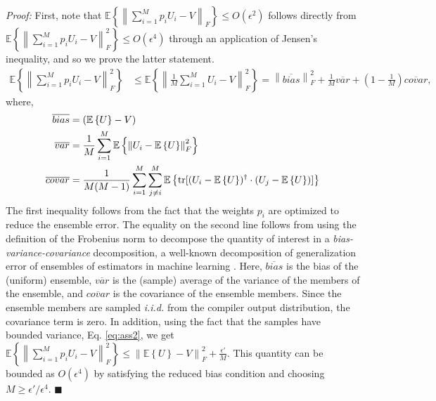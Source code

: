 \documentclass[fleqn,10pt]{wlscirep}
\newcommand{\dg}{^\dagger}
\newcommand{\normf}[1]{\left\lVert #1 \right\rVert_F}
\newcommand{\E}[1]{\mathbb{E}\left\{ #1 \right\}}
\newcommand{\tr}{{\rm tr}}
\newcommand*{\QED}{\null\nobreak\hfill\ensuremath{\blacksquare}}%
\begin{document}
\noindent \textit{Proof:} First, note that $\E{\normf{\sum_{i=1}^M p_i U_i - V}} \leq O(\epsilon^2)$ follows directly from $\E{\normf{\sum_{i=1}^M p_i U_i - V}^2} \leq O(\epsilon^4)$ through an application of Jensen's inequality, and so we prove the latter statement.
\begin{align}
    \E{\normf{\sum_{i=1}^M p_i U_i - V}^2} & \leq \E{\normf{\frac{1}{M}\sum_{i=1}^M U_i - V}^2} 
	   = \normf{\overline{bias}}^2 + \frac{1}{M}\overline{var} + \left(1-\frac{1}{M}\right)\overline{covar}, 
       \label{eq:b-v-c} 
\end{align}
where,
\begin{align}
	\overline{bias} &= (\E{U} - V) \label{eq:bias} \\
	\overline{var} &= \frac{1}{M}\sum_{i=1}^{M} \E{\normf{U_i - \E{U}}^2} \label{eq:var} \\
	\overline{covar} &= \frac{1}{M(M-1)}\sum_{i=1}^M \sum_{j \neq i}^M \mathbb{E} \left\{ \tr[(U_i-\E{U})\dg \cdot (U_j - \E{U})] \right\} 
    \label{eq:covar}
\end{align}
The first inequality follows from the fact that the weights $p_i$ are optimized to reduce the ensemble error. The equality on the second line follows from using the definition of the Frobenius norm to decompose the quantity of interest in a \emph{bias-variance-covariance} decomposition, a well-known decomposition of generalization error of ensembles of estimators in machine learning \cite{Ueda_1996, Brown_20005}. Here, $\overline{bias}$ is the bias of the (uniform) ensemble, $\overline{var}$ is the (sample) average of the variance of the members of the ensemble, and $\overline{covar}$ is the covariance of the ensemble members. Since the ensemble members are sampled \emph{i.i.d.} from the compiler output distribution, the covariance term is zero. In addition, using the fact that the samples have bounded variance, Eq. \eqref{eq:ass2}, we get
$\E{\normf{\sum_{i=1}^M p_i U_i - V}^2} \leq \normf{\E{U}-V}^2 + \frac{\epsilon'}{M}$.
This quantity can be bounded as $O(\epsilon^4)$ by satisfying the reduced bias condition and choosing $M \geq \epsilon'/\epsilon^4$. \QED
\\
\end{document}
